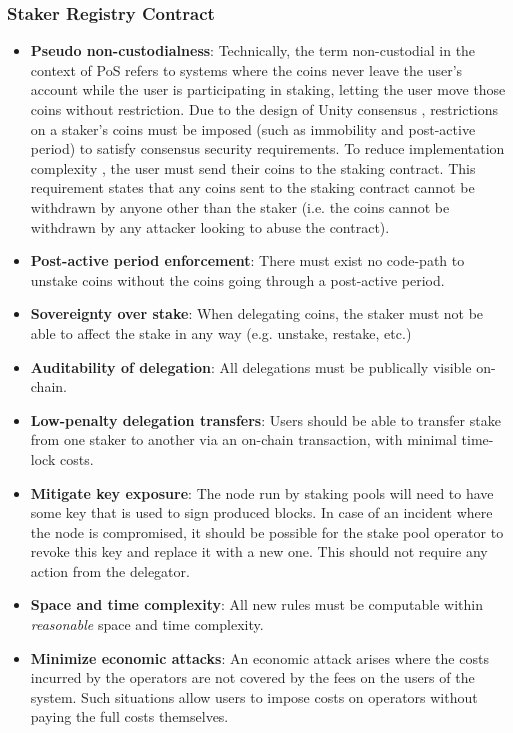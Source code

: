\subsubsection{Staker Registry Contract}
\begin{itemize}
    \item \textbf{Pseudo non-custodialness}: Technically, the term non-custodial in the context of PoS refers to systems where the coins never leave the user's account while the user is participating in staking, letting the user move those coins without restriction. Due to the design of Unity consensus \cite{WZS19}, restrictions on a staker's coins must be imposed (such as immobility and post-active period) to satisfy consensus security requirements. To reduce implementation complexity \cite{ZZW19}, the user must send their coins to the staking contract. This requirement states that any coins sent to the staking contract cannot be withdrawn by anyone other than the staker (i.e. the coins cannot be withdrawn by any attacker looking to abuse the contract).
    \item \textbf{Post-active period enforcement}: There must exist no code-path to unstake coins without the coins going through a post-active period. 
    \item \textbf{Sovereignty over stake}: When delegating coins, the staker must not be able to affect the stake in any way (e.g. unstake, restake, etc.) 
    \item \textbf{Auditability of delegation}: All delegations must be publically visible on-chain. 
    \item \textbf{Low-penalty delegation transfers}: Users should be able to transfer stake from one staker to another via an on-chain transaction, with minimal time-lock costs.
    \item \textbf{Mitigate key exposure}: The node run by staking pools will need to have some key that is used to sign produced blocks. In case of an incident where the node is compromised, it should be possible for the stake pool operator to revoke this key and replace it with a new one. This should not require any action from the delegator. 
    \item \textbf{Space and time complexity}: All new rules must be computable within \textit{reasonable} space and time complexity. 
    \item \textbf{Minimize economic attacks}: An economic attack arises where the costs incurred by the operators are not covered by the fees on the users of the system. Such situations allow users to impose costs on operators without paying the full costs themselves.
\end{itemize}

